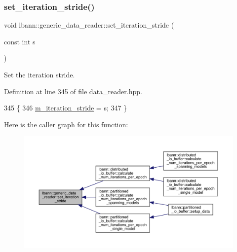 \subsubsection{\texorpdfstring{set\+\_\+iteration\+\_\+stride()}{set\_iteration\_stride()}}
{\footnotesize\ttfamily void lbann\+::generic\+\_\+data\+\_\+reader\+::set\+\_\+iteration\+\_\+stride (\begin{DoxyParamCaption}\item[{const int}]{s }\end{DoxyParamCaption})\hspace{0.3cm}{\ttfamily [inline]}}



Set the iteration stride. 



Definition at line 345 of file data\+\_\+reader.\+hpp.


\begin{DoxyCode}
345                                          \{
346     \hyperlink{classlbann_1_1generic__data__reader_a73b23a2e7768db4e9e8ba4d9a362163a}{m\_iteration\_stride} = s;
347   \}
\end{DoxyCode}
Here is the caller graph for this function\+:\nopagebreak
\begin{figure}[H]
\begin{center}
\leavevmode
\includegraphics[width=350pt]{classlbann_1_1generic__data__reader_ac1f3f81ca0e2920658cba026fe09a95b_icgraph}
\end{center}
\end{figure}
\mbox{\label{classlbann_1_1generic__data__reader_af45f301cc9adc2f8184b81d8d2600b8f}} 

